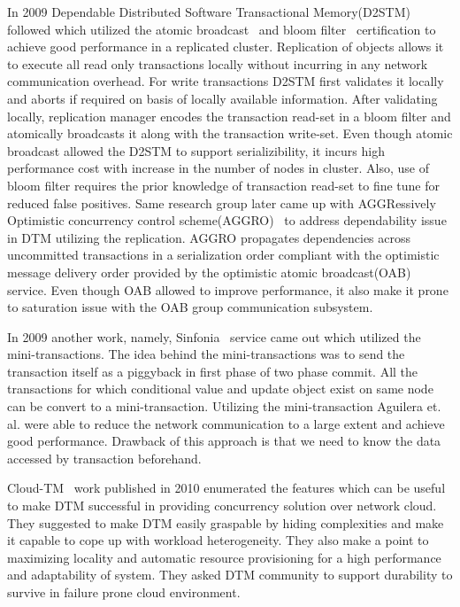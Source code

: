 \documentclass[12pt,english]{report}
\begin{document}
In 2009 Dependable Distributed Software Transactional Memory(D2STM)~\cite{D2STM:5368778} followed which utilized the atomic broadcast~\cite{Defago:2004:TOB:1041680.1041682} and bloom filter~\cite{Bloom:1970:STH:362686.362692} certification to achieve good performance in a replicated cluster. Replication of objects allows it to execute all read only transactions locally without incurring in any network communication overhead. For write transactions D2STM first validates it locally and aborts if required on basis of locally available information. After validating locally, replication manager encodes the transaction read-set in a bloom filter and atomically broadcasts it along with the transaction write-set. Even though atomic broadcast allowed the D2STM to support serializibility, it incurs high performance cost with increase in the number of nodes in cluster. Also, use of bloom filter requires the prior knowledge of transaction read-set to fine tune for reduced false positives. Same research group later came up with AGGRessively Optimistic concurrency control scheme(AGGRO)~\cite{AGGRO:5598236} to address dependability issue in DTM utilizing the replication. AGGRO propagates dependencies across uncommitted transactions in a serialization order compliant with the optimistic message delivery order provided by the optimistic atomic broadcast(OAB)~\cite{OAB:Pedone200379} service. Even though OAB allowed to improve performance, it also make it prone to saturation issue with the OAB group communication subsystem.  

In 2009 another work, namely, Sinfonia~\cite{Aguilera:2009:SNP:1629087.1629088} service came out which utilized the mini-transactions. The idea behind the mini-transactions was to send the transaction itself as a piggyback in first phase of two phase commit. All the transactions for which conditional value and update object exist on same node can be convert to a mini-transaction. Utilizing the mini-transaction Aguilera et. al. were able to reduce the network communication to a large extent and achieve good performance. Drawback of this approach is that we need to know the data accessed by transaction beforehand.

Cloud-TM~\cite{Romano:2010:CHC:1773912.1773914} work published in 2010 enumerated the features which can be useful to make DTM successful in providing concurrency solution over network cloud. They suggested to make DTM easily graspable by hiding complexities and make it capable to cope up with workload heterogeneity. They also make a point to maximizing locality and automatic resource provisioning for a high performance and adaptability of system. They asked DTM community to support durability to survive in failure prone cloud environment. 
\end{document}
